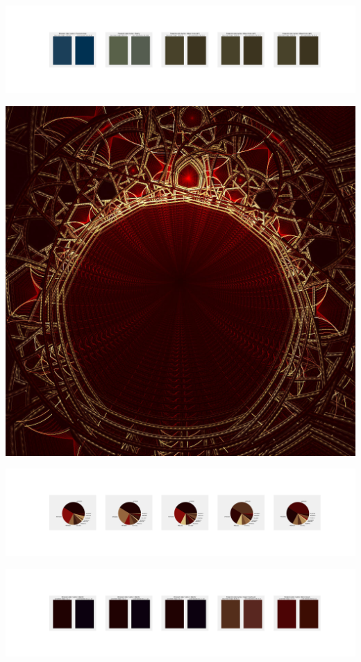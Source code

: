 \documentclass[11pt]{article}
\begin{document}
\begin{landscape}
    \begin{center}
    \includegraphics[width=250mm]{./nbimg/peak-429.jpg}
    \end{center}
    

    \begin{center}
    \includegraphics[width=\textwidth]{./nbimg/file (80).jpg}
    \end{center}

    \begin{center}
    \includegraphics[width=250mm]{./nbimg/pie-430.jpg}
    \end{center}

    \begin{center}
    \includegraphics[width=250mm]{./nbimg/peak-430.jpg}
    \end{center}
    


\end{landscape}
\end{document}
